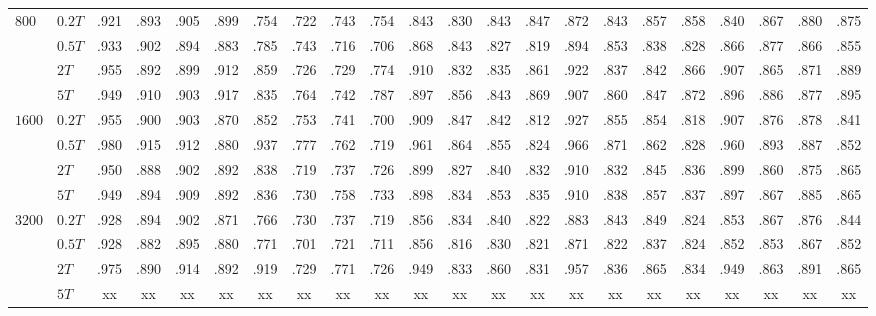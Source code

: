 \begin{sidewaystable}
\begin{tabular}{llcccccccccccccccccccc}
\hline
$800$ 	& $0.2T$ 	& .921& .893& .905& .899& .754& .722& .743& .754& .843& .830& .843& .847& .872& .843& .857& .858& .840& .867& .880& .875\\
		& $0.5T$ 	& .933& .902& .894& .883& .785& .743& .716& .706& .868& .843& .827& .819& .894& .853& .838& .828& .866& .877& .866& .855\\
		& $2T$ 		& .955& .892& .899& .912& .859& .726& .729& .774& .910& .832& .835& .861& .922& .837& .842& .866& .907& .865& .871& .889\\
		& $5T$ 		& .949& .910& .903& .917& .835& .764& .742& .787& .897& .856& .843& .869& .907& .860& .847& .872& .896& .886& .877& .895\\
\hline
$1600$	& $0.2T$ 	& .955& .900& .903& .870& .852& .753& .741& .700& .909& .847& .842& .812& .927& .855& .854& .818& .907& .876& .878& .841\\
		& $0.5T$ 	& .980& .915& .912& .880& .937& .777& .762& .719& .961& .864& .855& .824& .966& .871& .862& .828& .960& .893& .887& .852\\
		& $2T$ 		& .950& .888& .902& .892& .838& .719& .737& .726& .899& .827& .840& .832& .910& .832& .845& .836& .899& .860& .875& .865\\
		& $5T$ 		& .949& .894& .909& .892& .836& .730& .758& .733& .898& .834& .853& .835& .910& .838& .857& .837& .897& .867& .885& .865\\
\hline
$3200$ 	& $0.2T$ 	& .928& .894& .902& .871& .766& .730& .737& .719& .856& .834& .840& .822& .883& .843& .849& .824& .853& .867& .876& .844\\
		& $0.5T$ 	& .928& .882& .895& .880& .771& .701& .721& .711& .856& .816& .830& .821& .871& .822& .837& .824& .852& .853& .867& .852\\
		& $2T$ 		& .975& .890& .914& .892& .919& .729& .771& .726& .949& .833& .860& .831& .957& .836& .865& .834& .949& .863& .891& .865\\
		& $5T$ 		& xx & xx & xx & xx & xx & xx & xx & xx & xx & xx & xx & xx & xx & xx & xx & xx & xx & xx & xx & xx\\
\hline
\end{tabular}
\end{sidewaystable}